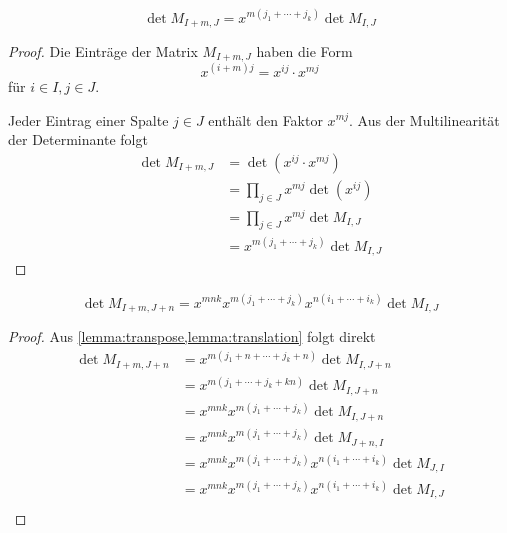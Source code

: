 \begin{lemma} \label{lemma:translation}
    \begin{equation*}
        \det{} M_{I+m,J} = x^{m(j_1+\cdots +j_k)} \det M_{I,J}
    \end{equation*}
\end{lemma}

\begin{proof}
    Die Einträge der Matrix $M_{I+m,J}$ haben die Form 
    \begin{equation*}
        x^{(i+m)j} = x^{ij} \cdot x^{mj}
    \end{equation*} für $i\in I, j\in J$.

    Jeder Eintrag einer Spalte $j \in J$ enthält den Faktor $x^{mj}$. Aus der Multilinearität der Determinante folgt
    \begin{align*}
        \det M_{I+m,J}  &= \det (x^{ij} \cdot x^{mj}) \\ 
                        &= \prod_{j \in J} x^{mj} \det (x^{ij}) \\ 
                        &= \prod_{j \in J} x^{mj}  \det M_{I,J} \\
                        &= x^{m(j_1+\cdots +j_k)} \det M_{I,J}
    \end{align*}
\end{proof}

\begin{satz}
    \begin{equation*}
        \det{} M_{I+m,J+n} = x^{mnk} x^{m(j_1 +\cdots + j_k)} x^{n(i_1+\cdots +i_k)} \det{} M_{I,J}
    \end{equation*}
\end{satz}

\begin{proof}
    Aus \cref{lemma:transpose,lemma:translation} folgt direkt
    \begin{align*}
        \det{} M_{I+m,J+n}  &= x^{m(j_1 + n +\cdots + j_k + n)} \det{} M_{I,J+n} \\
                            &= x^{m(j_1 +\cdots + j_k + kn)} \det{} M_{I,J+n} \\
                            &= x^{mnk} x^{m(j_1 +\cdots + j_k)} \det{} M_{I,J+n} \\
                            &= x^{mnk} x^{m(j_1 +\cdots + j_k)} \det{} M_{J+n,I} \\
                            &= x^{mnk} x^{m(j_1 +\cdots + j_k)} x^{n(i_1+\cdots +i_k)} \det{} M_{J,I} \\
                            &= x^{mnk} x^{m(j_1 +\cdots + j_k)} x^{n(i_1+\cdots +i_k)} \det{} M_{I,J} \\
    \end{align*}
\end{proof}

